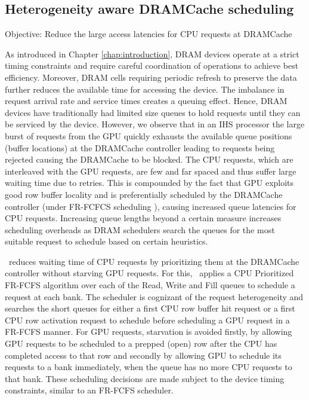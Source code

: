 \subsection{Heterogeneity aware DRAMCache scheduling} 
Objective: Reduce the large access latencies for CPU requests at DRAMCache
\par As introduced in Chapter \ref{chap:introduction}, DRAM devices operate at a strict timing constraints and require careful coordination of operations to achieve best efficiency. Moreover, DRAM cells requiring periodic refresh to preserve the data further reduces the available time for accessing the device. The imbalance in request arrival rate and service times creates a queuing effect. Hence, DRAM devices have traditionally had limited size queues to hold requests until they can be serviced by the device. However, we observe that in an IHS processor the large burst of requests from the GPU quickly exhausts the available queue positions (buffer locations) at the DRAMCache controller leading to requests being rejected causing the DRAMCache to be blocked. 
The CPU requests, which are interleaved with the GPU requests, are few and far spaced and thus suffer large waiting time due to retries. This is compounded by the fact that GPU exploits good row buffer locality and is preferentially scheduled by the DRAMCache controller (under FR-FCFCS scheduling \cite{sms}), causing increased queue latencies for CPU requests. Increasing queue lengths beyond a certain measure increases scheduling overheads as DRAM schedulers search the queues for the most suitable request to schedule based on certain heuristics.
\par \cachename\ reduces waiting time of CPU requests by prioritizing them at the DRAMCache controller without starving GPU requests. 
For this, \cachename\ applies a CPU Prioritized FR-FCFS algorithm over each of the Read, Write and Fill queues to schedule a request at each bank. 
The scheduler is cognizant of the request heterogeneity and searches the short queues for either a first CPU row buffer hit request or a first CPU row activation request to schedule before scheduling a GPU request in a FR-FCFS manner. For GPU requests, starvation is avoided firstly, by allowing GPU requests to be scheduled to a prepped (open) row after the CPU has completed access to that row and secondly by allowing GPU to schedule its requests to a bank immediately, when the queue has no more CPU requests to that bank. These scheduling decisions are made subject to the device timing constraints, similar to an FR-FCFS scheduler.
